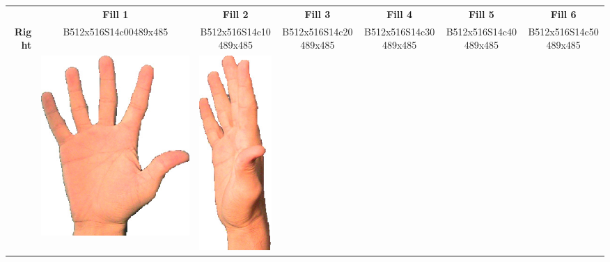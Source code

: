 \documentclass{article}
\begin{document}
\begin{center}
\begin{tabular}{r*{6}{c}}
&\textbf{Fill 1}&\textbf{Fill 2}&\textbf{Fill 3}&\textbf{Fill 4}&\textbf{Fill 5}&\textbf{Fill 6}\\
\multirow{2}{*}{\textbf{Right}}&
B512x516S14c00489x485&
B512x516S14c10489x485&
B512x516S14c20489x485&
B512x516S14c30489x485&
B512x516S14c40489x485&
B512x516S14c50489x485\\
&
\includegraphics[scale=0.1]{images/05-01-1.jpg}&
\includegraphics[scale=0.1]{images/05-01-2.jpg}&

\end{tabular}
\end{center}
\end{document}
